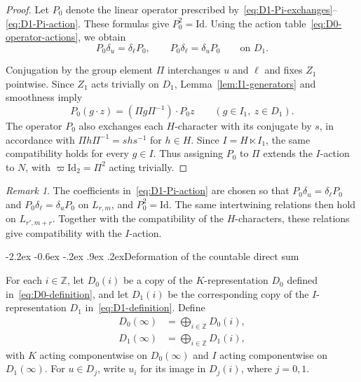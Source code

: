 \documentclass[10pt]{article}
\makeatletter
\renewcommand\subsection{\@startsection{subsection}{2}{\z@}%
  {-2.2ex \@plus -0.6ex \@minus -.2ex}%
  {.9ex \@plus .2ex}{\normalfont\large\bfseries}}
\theoremstyle{plain}
\theoremstyle{definition}
\theoremstyle{remark}
\newtheorem{remark}[theorem]{Remark}
\newcommand{\Id}{\mathrm{Id}}
\makeatother
\begin{document}
\begin{proof}
Let $P_0$ denote the linear operator prescribed by~\eqref{eq:D1-Pi-exchanges}--\eqref{eq:D1-Pi-action}. These formulas give $P_0^2=\Id$. Using the action table~\eqref{eq:D0-operator-actions}, we obtain
\begin{equation}\label{eq:D1-Pi-commutation}
P_0\delta_u=\delta_{\ell}P_0,\qquad
P_0\delta_{\ell}=\delta_uP_0 \qquad\text{on }D_1.
\end{equation}

Conjugation by the group element $\Pi$ interchanges $u$ and $\ell$ and fixes $Z_1$ pointwise. Since $Z_1$ acts trivially on $D_1$, Lemma~\ref{lem:I1-generators} and smoothness imply
\[
P_0(g\cdot z)=(\Pi g\Pi^{-1})\cdot P_0z
\qquad(g\in I_1,\ z\in D_1).
\]
The operator $P_0$ also exchanges each $H$-character with its conjugate by $s$, in accordance with $\Pi h\Pi^{-1}=shs^{-1}$ for $h\in H$. Since $I=H\ltimes I_1$, the same compatibility holds for every $g\in I$. Thus assigning $P_0$ to $\Pi$ extends the $I$-action to $N$, with $\varpi\Id_2=\Pi^2$ acting trivially. 
\end{proof}
\begin{remark}
The coefficients in~\eqref{eq:D1-Pi-action} are chosen so that $P_0\delta_u=\delta_{\ell}P_0$ and $P_0\delta_{\ell}=\delta_uP_0$ on $L_{r,m}$, and $P_0^2=\Id$. The same intertwining relations then hold on $L_{r',m+r}$. Together with the compatibility of the $H$-characters, these relations give compatibility with the $I$-action.
\end{remark}

\subsection{Deformation of the countable direct sum}

For each $i\in\mathbb{Z}$, let $D_0(i)$ be a copy of the $K$-representation $D_0$ defined in~\eqref{eq:D0-definition}, and let $D_1(i)$ be the corresponding copy of the $I$-representation $D_1$ in~\eqref{eq:D1-definition}. Define
\begin{align}
D_0(\infty)&=\bigoplus_{i\in\mathbb{Z}}D_0(i),\label{eq:D0-infinity}\\
D_1(\infty)&=\bigoplus_{i\in\mathbb{Z}}D_1(i),\label{eq:D1-infinity}
\end{align}
with $K$ acting componentwise on $D_0(\infty)$ and $I$ acting componentwise on $D_1(\infty)$. For $u\in D_j$, write $u_i$ for its image in $D_j(i)$, where $j=0,1$.
\end{document}
